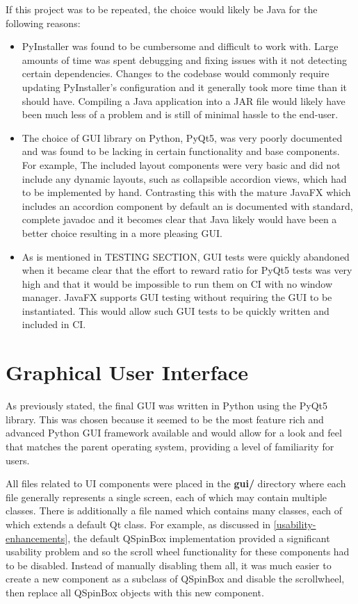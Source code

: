 \documentclass{l4proj}
\begin{document}
If this project was to be repeated, the choice would likely be Java for the following reasons:
\begin{itemize}
    \item PyInstaller was found to be cumbersome and difficult to work with. Large amounts of time was spent debugging and fixing issues with it not detecting certain dependencies. Changes to the codebase would commonly require updating PyInstaller's configuration and it generally took more time than it should have. Compiling a Java application into a JAR file would likely have been much less of a problem and is still of minimal hassle to the end-user.
    \item The choice of GUI library on Python, PyQt5, was very poorly documented and was found to be lacking in certain functionality and base components. For example, The included layout components were very basic and did not include any dynamic layouts, such as collapsible accordion views, which had to be implemented by hand. Contrasting this with the mature JavaFX which includes an accordion component by default an is documented with standard, complete javadoc and it becomes clear that Java likely would have been a better choice resulting in a more pleasing GUI.
    \item As is mentioned in TESTING SECTION, GUI tests were quickly abandoned when it became clear that the effort to reward ratio for PyQt5 tests was very high and that it would be impossible to run them on CI with no window manager. JavaFX supports GUI testing without requiring the GUI to be instantiated. This would allow such GUI tests to be quickly written and included in CI.
\end{itemize}


\section{Graphical User Interface}
As previously stated, the final GUI was written in Python using the PyQt5 library. This was chosen because it seemed to be the most feature rich and advanced Python GUI framework available and would allow for a look and feel that matches the parent operating system, providing a level of familiarity for users.

All files related to UI components were placed in the \textbf{gui/} directory where each file generally represents a single screen, each of which may contain multiple classes. There is additionally a file named  which contains many classes, each of which extends a default Qt class. For example, as discussed in \ref{usability-enhancements}, the default QSpinBox implementation provided a significant usability problem and so the scroll wheel functionality for these components had to be disabled. Instead of manually disabling them all, it was much easier to create a new component as a subclass of QSpinBox and disable the scrollwheel, then replace all QSpinBox objects with this new component.
\end{document}
